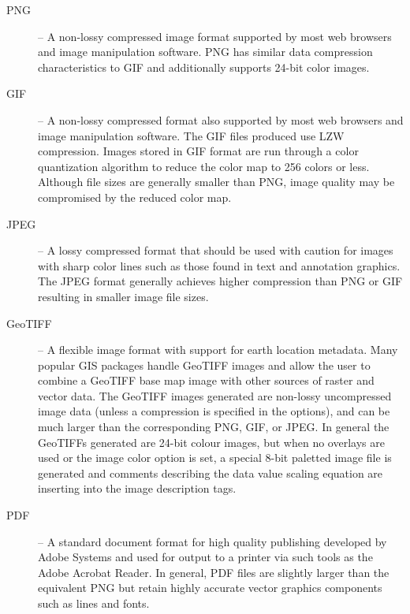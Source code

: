 \begin{description}

\item[PNG] -- A non-lossy compressed image format supported by
most web browsers and image manipulation software. PNG has
similar data compression characteristics to GIF and additionally
supports 24-bit color images.

\item[GIF] -- A non-lossy compressed format also supported by most
web browsers and image manipulation software. The GIF files
produced use LZW compression. Images stored in GIF format are run
through a color quantization algorithm to reduce the color map to
256 colors or less. Although file sizes are generally smaller
than PNG, image quality may be compromised by the reduced color
map.

\item[JPEG] -- A lossy compressed format that should be used with
caution for images with sharp color lines such as those found in
text and annotation graphics. The JPEG format generally achieves
higher compression than PNG or GIF resulting in smaller image
file sizes.

\item[GeoTIFF] -- A flexible image format with support for earth
location metadata. Many popular GIS packages handle GeoTIFF
images and allow the user to combine a GeoTIFF base map image
with other sources of raster and vector data. The GeoTIFF images
generated are non-lossy uncompressed image data (unless a
compression is specified in the options), and can be much larger
than the corresponding PNG, GIF, or JPEG. In general the GeoTIFFs
generated are 24-bit colour images, but when no overlays are used
or the image color option is set, a special 8-bit paletted image
file is generated and comments describing the data value scaling
equation are inserting into the image description tags.

\item[PDF] -- A standard document format for high quality
publishing developed by Adobe Systems and used for output to a
printer via such tools as the Adobe Acrobat Reader. In general,
PDF files are slightly larger than the equivalent PNG but retain
highly accurate vector graphics components such as lines and
fonts.

\end{description}

